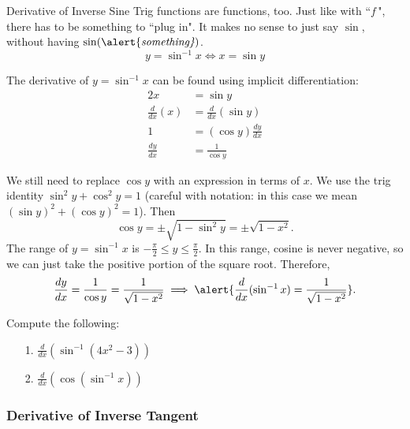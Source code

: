 \documentclass[cal1spr16Lectures.tex]{subfiles}
\begin{document}
\begin{frame}{\small Derivative of Inverse Sine}
Trig functions are functions, too.  Just like with ``$f\,$", there has to be something to ``plug in".  It makes no sense to just say $\sin$, without having $\sin(\text{\alert{\it something}})$.
\[y=\sin^{-1}x \Longleftrightarrow x=\sin y\]  
\end{frame}

\begin{frame}\footnotesize
The derivative of $y=\sin^{-1}x$ can be found using implicit differentiation: 
\begin{alignat*}{2}
x &= \sin y \\
\frac{d}{dx}(x) &= \frac{d}{dx}(\sin y) \\
1 &= (\cos y) \frac{dy}{dx} \\
\frac{dy}{dx} &= \frac{1}{\cos y}
\end{alignat*}
\end{frame}

\begin{frame}\footnotesize
We still need to replace $\cos y$ with an expression in terms of $x$.  We use the trig identity $\sin^2 y + \cos^2 y = 1$ (careful with notation: in this case we mean $\left(\sin y\right)^2+\left(\cos y\right)^2=1$).  Then 
\[\cos y= \pm \sqrt{1-\sin^2 y}=\pm\sqrt{1-x^2}.\]
The range of $y=\sin^{-1}x$ is $-\textstyle\frac{\pi}{2} \leq y \leq \frac{\pi}{2}$.  In this range, cosine is never negative, so we can just take the positive portion of the square root.
Therefore,
\[\frac{dy}{dx}=\frac{1}{\cos y}=\frac{1}{\sqrt{1-x^2}} \implies \alert{\frac{d}{dx}(\sin^{-1}x)=\frac{1}{\sqrt{1-x^2}}}.\]
\end{frame}

\begin{frame}{}
\begin{exe} Compute the following:
\begin{itemize}
\item[1.] $\frac{d}{dx} \left( \sin^{-1}(4x^2-3) \right)$
\item[2.] $\frac{d}{dx} \left( \cos(\sin^{-1}x) \right)$
\end{itemize}
\end{exe}
\end{frame}

\subsubsection{Derivative of Inverse Tangent}
\end{document}
